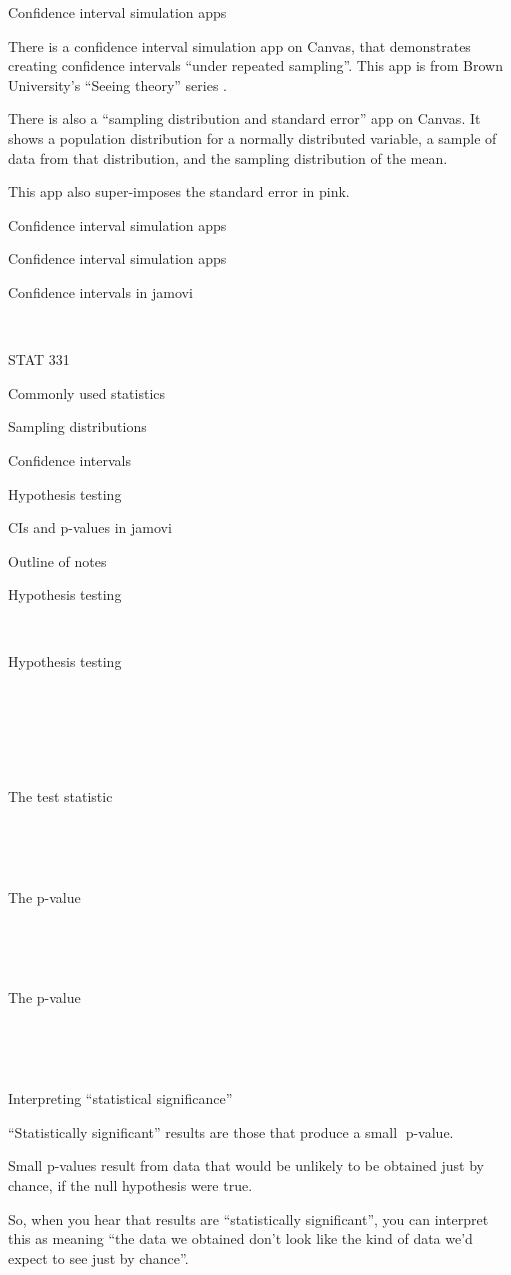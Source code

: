 \documentclass[
  letterpaper,
  DIV=11,
  numbers=noendperiod]{scrreprt}
\begin{document}
Confidence interval simulation apps

There is a confidence interval simulation app on Canvas, that
demonstrates creating confidence intervals ``under repeated sampling''.
This app is from Brown University's ``Seeing theory'' series .

There is also a ``sampling distribution and standard error'' app on
Canvas. It shows a population distribution for a normally distributed
variable, a sample of data from that distribution, and the sampling
distribution of the mean.

This app also super-imposes the standard error in pink.

Confidence interval simulation apps

Confidence interval simulation apps

Confidence intervals in jamovi

~

STAT 331

Commonly used statistics

Sampling distributions

Confidence intervals

Hypothesis testing

CIs and p-values in jamovi

Outline of notes

Hypothesis testing

~

Hypothesis testing

~

~

~

The test statistic

~

~

The p-value

~

~

The p-value

~

~

Interpreting ``statistical significance''

``Statistically significant'' results are those that produce a small
p-value.

Small p-values result from data that would be unlikely to be obtained
just by chance, if the null hypothesis were true.

So, when you hear that results are ``statistically significant'', you
can interpret this as meaning ``the data we obtained don't look like the
kind of data we'd expect to see just by chance''.
\end{document}
